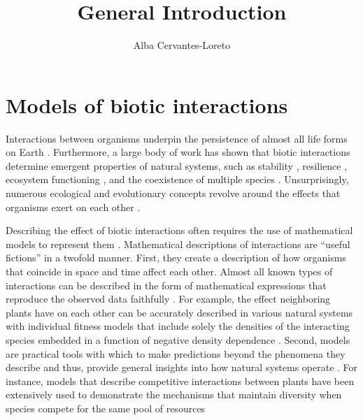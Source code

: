 \documentclass[12pt]{article}
\title{General Introduction}
\author[1]{Alba Cervantes-Loreto}
\date{}
\begin{document}
\linenumbers
\baselineskip30pt
\maketitle

\section*{Models of biotic interactions}
Interactions between organisms underpin the persistence of almost all life forms on Earth \citep{lawton1999there}. Furthermore, a large body of work has shown that biotic interactions determine emergent properties of natural systems, such as stability \citep{may1972will, wootton2016many,song2018will}, resilience \citep{capdevila2021reconciling}, ecosystem functioning \citep{turnbull2013coexistence,godoy2020excess}, and the coexistence of multiple species \citep{chesson2000mechanisms,saavedra2017structural}. Unsurprisingly, numerous ecological and evolutionary concepts revolve around the effects that organisms exert on each other \citep{gause_experimental_1934,macarthur1967limiting,thompson1999evolution, hillerislambers2012rethinking, chase2009ecological}.

Describing the effect of biotic interactions often requires the use of mathematical models to represent them \citep{maynard1978models,rossberg2019let}. Mathematical descriptions of interactions are ``useful fictions'' \citep{box2011statistical} in a twofold manner. First, they create a description of how organisms that coincide in space and time affect each other. Almost all known types of interactions can be described in the form of mathematical expressions that reproduce the observed data faithfully \citep{volterra1926fluctuations,holling1959some,holt1977predation,adler2018competition,wood1999super,holland2002population,vazquez2005interaction,stouffer2021hidden} . For example, the effect neighboring plants have on each other can be accurately described in various natural systems with individual fitness models that include solely the densities of the interacting species embedded in a function of negative density dependence \citep{adler2018competition,hart2018quantify}. Second, models are practical tools with which to make predictions beyond the phenomena they describe and thus, provide general insights into how natural systems operate \citep{evans2012predictive,stouffer2019all}. For instance, models that describe competitive interactions between plants have been extensively used to demonstrate the mechanisms that maintain diversity when species compete for the same pool of resources \citep{levine2009importance,godoy_phylogenetic_2014, godoy_phenology_2014, stouffer2018cyclic,bimler_accurate_2018}
\end{document}
